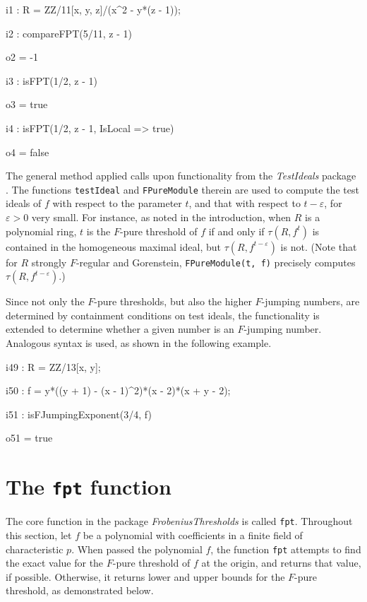\documentclass{amsart}
\begin{document}
{\small
{}
\begin{MyVerbatim}

i1 : R = ZZ/11[x, y, z]/(x^2 - y*(z - 1));

i2 : compareFPT(5/11, z - 1)

o2 = -1

i3 : isFPT(1/2, z - 1)

o3 = true

i4 : isFPT(1/2, z - 1, IsLocal => true)

o4 = false
\end{MyVerbatim}
}
\medspace

The general method applied calls upon functionality from the \emph{TestIdeals} package \cite{TestIdealsPackage, TestIdealsPaper}.  The functions {\tt testIdeal} and {\tt FPureModule} therein are used
to compute the test ideals of $f$ with respect to the parameter $t$, and that with respect to $t - \varepsilon$, for $\varepsilon>0$ very small. For instance, as noted in the introduction, when $R$ is a polynomial ring, $t$ is the $F$-pure threshold of $f$ if and only if $\tau(R, f^t)$ is contained in the homogeneous maximal ideal, but
$\tau(R, f^{t-\varepsilon})$ is not.
(Note that for $R$ strongly $F$-regular and Gorenstein, {\tt FPureModule(t, f)} precisely computes $\tau(R, f^{t-\varepsilon})$.)

Since not only the $F$-pure thresholds, but also the higher $F$-jumping numbers, are determined by containment conditions on test ideals, the functionality is extended to determine whether a given number is an $F$-jumping number.
Analogous syntax is used, as shown in the following example.

{\small
{}
\begin{MyVerbatim}

i49 : R = ZZ/13[x, y];

i50 : f = y*((y + 1) - (x - 1)^2)*(x - 2)*(x + y - 2);

i51 : isFJumpingExponent(3/4, f)

o51 = true
\end{MyVerbatim}
}
\medspace

\section{The {\tt fpt} function}
\label{sec.FPT}

The core function in the package \emph{FrobeniusThresholds} is called {\tt fpt}.  Throughout this section, let $f$ be a polynomial with coefficients in a finite field of characteristic $p$. When passed the polynomial $f$, the function {\tt fpt} attempts to find the exact value for the $F$-pure threshold of $f$ at the origin, and returns that value, if possible.  Otherwise, it returns lower and upper bounds for the $F$-pure threshold, as demonstrated below.
\end{document}
